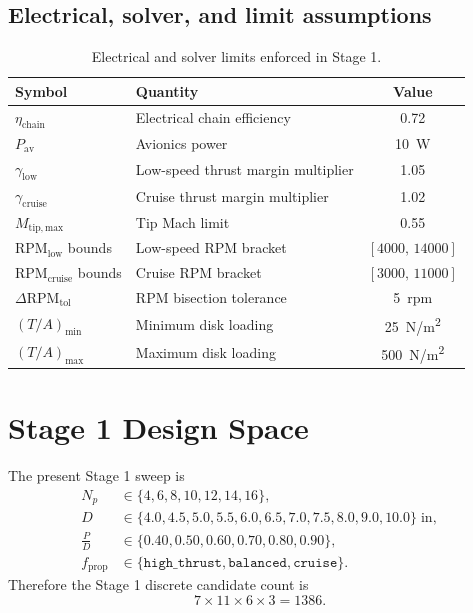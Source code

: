 \documentclass[11pt]{article}
\begin{document}
\subsection{Electrical, solver, and limit assumptions}

\begin{table}[h]
\centering
\begin{tabular}{llc}
\toprule
Symbol & Quantity & Value \\
\midrule
\(\eta_{\mathrm{chain}}\) & Electrical chain efficiency & 0.72 \\
\(P_{\mathrm{av}}\) & Avionics power & \SI{10}{W} \\
\(\gamma_{\mathrm{low}}\) & Low-speed thrust margin multiplier & 1.05 \\
\(\gamma_{\mathrm{cruise}}\) & Cruise thrust margin multiplier & 1.02 \\
\(M_{\mathrm{tip,max}}\) & Tip Mach limit & 0.55 \\
\(\mathrm{RPM}_{\mathrm{low}}\) bounds & Low-speed RPM bracket & \([4000,\,14000]\) \\
\(\mathrm{RPM}_{\mathrm{cruise}}\) bounds & Cruise RPM bracket & \([3000,\,11000]\) \\
\(\Delta \mathrm{RPM}_{\mathrm{tol}}\) & RPM bisection tolerance & \SI{5}{rpm} \\
\(\left(T/A\right)_{\min}\) & Minimum disk loading & \SI{25}{N/m^2} \\
\(\left(T/A\right)_{\max}\) & Maximum disk loading & \SI{500}{N/m^2} \\
\bottomrule
\end{tabular}
\caption{Electrical and solver limits enforced in Stage 1.}
\end{table}

\section{Stage 1 Design Space}

The present Stage 1 sweep is
\begin{align}
N_p &\in \{4,6,8,10,12,14,16\}, \\
D &\in \{4.0,4.5,5.0,5.5,6.0,6.5,7.0,7.5,8.0,9.0,10.0\}\;\mathrm{in}, \\
\frac{P}{D} &\in \{0.40,0.50,0.60,0.70,0.80,0.90\}, \\
f_{\mathrm{prop}} &\in \{\texttt{high\_thrust},\texttt{balanced},\texttt{cruise}\}.
\end{align}
Therefore the Stage 1 discrete candidate count is
\begin{equation}
7 \times 11 \times 6 \times 3 = 1386.
\end{equation}
\end{document}
